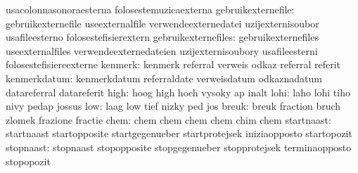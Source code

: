                                   usacolonnasonoraesterna          folosestemuzicaexterna
              gebruikexternefile: gebruikexternefile               useexternalfile
                                  verwendeexternedatei             uzijexternisoubor
                                  usafileesterno                   folosestefisierextern
             gebruikexternefiles: gebruikexternefiles              useexternalfiles
                                  verwendeexternedateien           uzijexternisoubory
                                  usafileesterni                   folosestefisiereexterne
                         kenmerk: kenmerk                          referral
                                  verweis                          odkaz
                                  referral                         referit %
                    kenmerkdatum: kenmerkdatum                     referraldate
                                  verweisdatum                     odkaznadatum
                                  datareferral                     datareferit
                            high: hoog                             high
                                  hoch                             vysoky
                                  ap                               inalt
                            lohi: laho                             lohi
                                  tiho                             nivy
                                  pedap                            jossus
                             low: laag                             low
                                  tief                             nizky
                                  ped                              jos
                           breuk: breuk                            fraction
                                  bruch                            zlomek
                                  frazione                         fractie
                            chem: chem                             chem
                                  chem                             chem
                                  chim                             chem
                      startnaast: startnaast                       startopposite
                                  startgegenueber                  startprotejsek
                                  iniziaopposto                    startopozit
                       stopnaast: stopnaast                        stopopposite
                                  stopgegenueber                   stopprotejsek
                                  terminaopposto                   stopopozit
